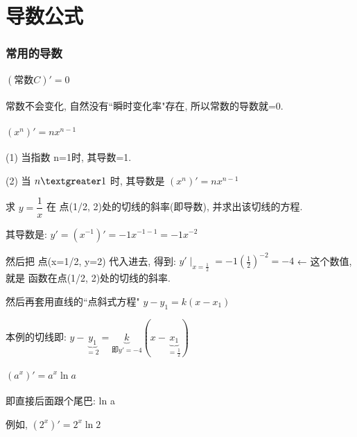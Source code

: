 \documentclass[UTF8]{ctexart}
\begin{document}
\part{导数公式}

\section{常用的导数}



\subsection{$(\text{常数}C)' =0$}

常数不会变化, 自然没有``瞬时变化率"存在, 所以常数的导数就=0.





\subsection{$(x^n)'= n x^{n-1}$}

(1) 当指数 n=1时, 其导数=1. 

(2)  当 $n \textgreater 1$ 时, 其导数是 $ (x^n)' = n x^{n-1}$ \\

\begin{myEnvSample}
求 $ y= \dfrac{1} {x}$  在 点(1/2, 2)处的切线的斜率(即导数), 并求出该切线的方程.

其导数是: $y'=\left( x^{-1} \right) '=-1x^{-1-1}=-1x^{-2}$

然后把 点(x=1/2, y=2) 代入进去, 得到: $y'\mid_{x=\frac{1}{2}}^{}=-1\left( \frac{1}{2} \right) ^{-2}=-4$  ← 这个数值, 就是 函数在点(1/2, 2)处的切线的斜率.

然后再套用直线的``点斜式方程" $y - y_1 = k(x- x_1)$

本例的切线即: $y-\underset{=2}{\underbrace{y_1}}=\underset{\text{即}y'=-4}{\underbrace{k}}\left( x-\underset{=\frac{1}{2}}{\underbrace{x_1}} \right)$
\end{myEnvSample}





\subsection{$\left( a^x \right) '=a^x\ln a$}

即直接后面跟个尾巴: ln a

例如, $(2^x)' = 2^x \ln 2$
\end{document}
